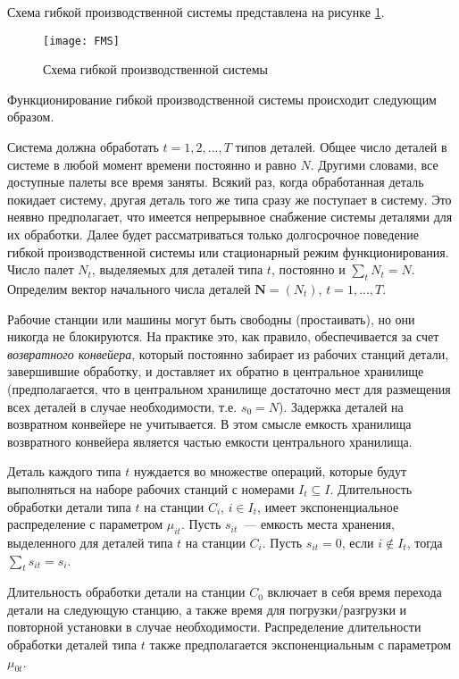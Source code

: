 Схема гибкой производственной системы представлена на рисунке \ref{fig:fms}.

\begin{figure}[H]
  \centering
  \texttt{[image: FMS]}
  \caption{Схема гибкой производственной системы}
  \label{fig:fms}
\end{figure}

Функционирование гибкой производственной системы происходит следующим образом.

Система должна обработать $t=1,2,...,T$ типов деталей. Общее число деталей в системе в любой момент времени постоянно и равно $N$. Другими словами, все доступные палеты все время заняты. Всякий раз, когда обработанная деталь покидает систему, другая деталь того же типа сразу же поступает в систему. Это неявно предполагает, что имеется непрерывное снабжение системы деталями для их обработки. Далее будет рассматриваться только долгосрочное поведение гибкой производственной системы или стационарный режим функционирования. Число палет $N_t$, выделяемых для деталей типа $t$, постоянно и $\sum\limits_t N_t = N$. Определим вектор начального числа деталей $\mathbf{N}=(N_t)$, $t=1,...,T$.

Рабочие станции или машины могут быть свободны (простаивать), но они никогда не блокируются. На практике это, как правило, обеспечивается за счет \textit{возвратного конвейера}, который постоянно забирает из рабочих станций детали, завершившие обработку, и доставляет их обратно в центральное хранилище (предполагается, что в центральном хранилище достаточно мест для размещения всех деталей в случае необходимости, т.е. $s_0=N$). Задержка деталей на возвратном конвейере не учитывается. В этом смысле емкость хранилища возвратного конвейера является частью емкости центрального хранилища.

Деталь каждого типа $t$ нуждается во множестве операций, которые будут выполняться на наборе рабочих станций с номерами $I_t \subseteq I$. Длительность обработки детали типа $t$ на станции $C_i$, $i \in I_t$, имеет экспоненциальное распределение с параметром $\mu_{it}$. Пусть $s_{it}$~--- емкость места хранения, выделенного для деталей типа $t$ на станции $C_i$. Пусть $s_{it}=0$, если $i \notin I_t$, тогда $\sum\limits_t s_{it} = s_i$.

Длительность обработки детали на станции $C_0$ включает в себя время перехода детали на следующую станцию, а также время для погрузки/разгрузки и повторной установки в случае необходимости. Распределение длительности обработки деталей типа $t$ также предполагается экспоненциальным с параметром $\mu_{0t}$.

